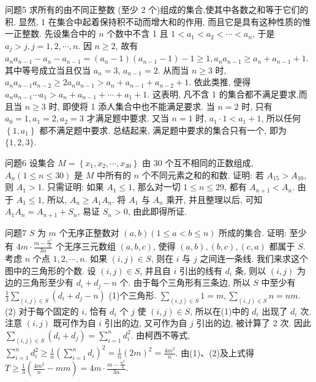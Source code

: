 问题5 求所有的由不同正整数 (至少 2 个)组成的集合,使其中各数之和等于它们的积.
显然, 1 在集合中起着保持积不动而增大和的作用, 而且它是具有这种性质的惟一正整数.
先设集合中的 $n$ 个数中不含 1 且 $1<a_1<a_2<\cdots< a_n$, 于是 $a_j>j, j=1,2, \cdots, n$. 因 $n \geqslant 2$, 故有 $a_n a_{n-1}-a_n-a_{n-1}= (a_n -  1) \left(a_{n-1}-1\right)-1 \geqslant 1, a_n a_{n-1} \geqslant a_n+a_{n-1}+1$. 其中等号成立当且仅当 $a_n=3$, $a_{n-1}=2$. 从而当 $n \geqslant 3$ 时, $a_n a_{n-1} a_{n-2} \geqslant 2 a_n a_{n-1}>a_n+a_{n-1}+a_{n-2}+1$. 依此类推, 便得 $a_n a_{n-1} \cdots a_1>a_n+a_{n-1}+\cdots+a_1+1$. 这表明, 凡不含 1 的集合都不满足要求,而且当 $n \geqslant 3$ 时, 即使将 1 添人集合中也不能满足要求.
当 $n=2$ 时, 只有 $a_0=1, a_1=2, a_2=3$ 才满足题中要求.
又当 $n=1$ 时, $a_1 \cdot 1<a_1+1$, 所以任何 $\left\{1, a_1\right\}$ 都不满足题中要求.
总结起来, 满足题中要求的集合只有一个, 即为 $\{1,2,3\}$.



问题6 设集合 $M=\left\{x_1, x_2, \cdots, x_{30}\right\}$ 由 30 个互不相同的正数组成, $A_n(1 \leqslant n \leqslant 30)$ 是 $M$ 中所有的 $n$ 个不同元素之和的和数.
证明: 若 $A_{15}>A_{10}$, 则 $A_1>1$.
只需证明: 如果 $A_1 \leqslant 1$, 那么对一切 $1 \leqslant n \leqslant 29$, 都有 $A_{n+1}<A_n$. 由于 $A_1 \leqslant 1$, 所以, $A_n \geqslant A_1 A_n$. 将 $A_1$ 与 $A_n$ 乘开, 并且整理以后, 可知 $A_1 A_n= A_{n+1}+S_n$, 易证 $S_n>0$, 由此即得所证.



问题7 $S$ 为 $m$ 个无序正整数对 $(a, b)(1 \leqslant a<b \leqslant n)$ 所成的集合.
证明: 至少有 $4 m \cdot \frac{m-\frac{n^2}{4}}{3 n}$ 个无序三元数组 $(a, b, c)$, 使得 $(a, b),(b, c),(c, a)$ 都属于 $S$.
考虑 $n$ 个点 $1,2, \cdots, n$. 如果 $(i, j) \in S$, 则在 $i$ 与 $j$ 之间连一条线.
我们来求这个图中的三角形的个数.
设 $(i, j) \in S$, 并且自 $i$ 引出的线有 $d_i$ 条, 则以 $(i, j)$ 为边的三角形至少有 $d_i+d_j-n$ 个.
由于每个三角形有三条边, 所以 $S$ 中至少有 $\frac{1}{3} \sum_{(i, j) \in S}\left(d_i+d_j-n\right)$ (1)个三角形.
$\sum_{(i, j) \in S} 1=m, \sum_{(i, j) \in S} n=n m$. (2)
对于每个固定的 $i$, 恰有 $d_i$ 个 $j$ 使 $(i, j) \in S$, 所以在(1)中的 $d_i$ 出现了 $d_i$ 次.
注意 $(i, j)$ 既可作为自 $i$ 引出的边, 又可作为自 $j$ 引出的边, 被计算了 2 次.
因此 $\sum_{(i, j) \in S}\left(d_i+d_j\right)=\sum_{i=1}^n d_i^2$. 由柯西不等式, $\sum_{i=1}^n d_i^2 \geqslant \frac{1}{n}\left(\sum_{i=1}^n d_i\right)^2= \frac{1}{n}(2 m)^2=\frac{4 m^2}{n}$. 由(1)、(2)及上式得 $T \geqslant \frac{1}{3}\left(\frac{4 m^2}{n}-m m\right)=4 m \cdot \frac{m-\frac{n^2}{4}}{3 n}$.



